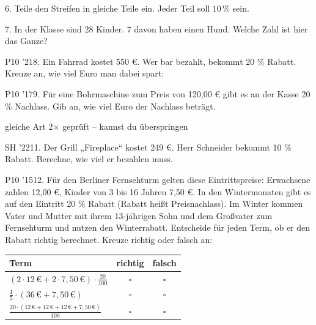 \documentclass[11pt]{article}
\begin{document}
\pfgruppe{}
\begin{pfaufg}{}{6.}{}
Teile den Streifen in gleiche Teile ein. Jeder Teil soll $10\,\%$ sein.
\par\smallskip\noindent \streifenleer[0]\par
{}
\end{pfaufg}
\begin{pfaufg}{}{7.}{}
In der Klasse sind $28$ Kinder. $7$ davon haben einen Hund. Welche Zahl ist hier das Ganze?
\end{pfaufg}
\pfgruppe{}
\begin{pfaufg}{P10 ’21}{8.}{}
Ein Fahrrad kostet 550 €. Wer bar bezahlt, bekommt 20 \% Rabatt. Kreuze an, wie viel Euro man dabei spart:
\end{pfaufg}
\pfgruppe{}
\begin{pfaufg}{P10 ’17}{9.}{}
Für eine Bohrmaschine zum Preis von 120,00 € gibt es an der Kasse 20 \% Nachlass. Gib an, wie viel Euro der Nachlass beträgt.
\end{pfaufg}
\begin{pfbuendel}{gleiche Art \textperiodcentered{} 2$\times$ geprüft – kannst du überspringen}
\end{pfbuendel}
\pfgruppe{}
\begin{pfaufg}{SH ’22}{11.}{}
Der Grill „Fireplace“ kostet 249 €. Herr Schneider bekommt 10 \% Rabatt. Berechne, wie viel er bezahlen muss.
\end{pfaufg}
\pfgruppe{}
\begin{pfaufg}{P10 ’15}{12.}{}
Für den Berliner Fernsehturm gelten diese Eintrittspreise: Erwachsene zahlen 12,00 €, Kinder von 3 bis 16 Jahren 7,50 €. In den Wintermonaten gibt es auf den Eintritt 20 \% Rabatt (Rabatt heißt Preisnachlass). Im Winter kommen Vater und Mutter mit ihrem 13-jährigen Sohn und dem Großvater zum Fernsehturm und nutzen den Winterrabatt. Entscheide für jeden Term, ob er den Rabatt richtig berechnet. Kreuze richtig oder falsch an:
\par\smallskip\noindent \begingroup\renewcommand{\arraystretch}{1.5}\begin{tabular}{|l|c|c|}\hline Term & richtig & falsch\\ \hline $(2\cdot 12\,€ + 2\cdot 7{,}50\,€)\cdot\tfrac{20}{100}$ & $\square$ & $\square$ \\ $\tfrac{1}{5}\cdot(36\,€ + 7{,}50\,€)$ & $\square$ & $\square$ \\ $\tfrac{20\cdot(12\,€ + 12\,€ + 12\,€ + 7{,}50\,€)}{100}$ & $\square$ & $\square$ \\ \hline\end{tabular}\endgroup\par
{}
\end{pfaufg}
\end{document}
